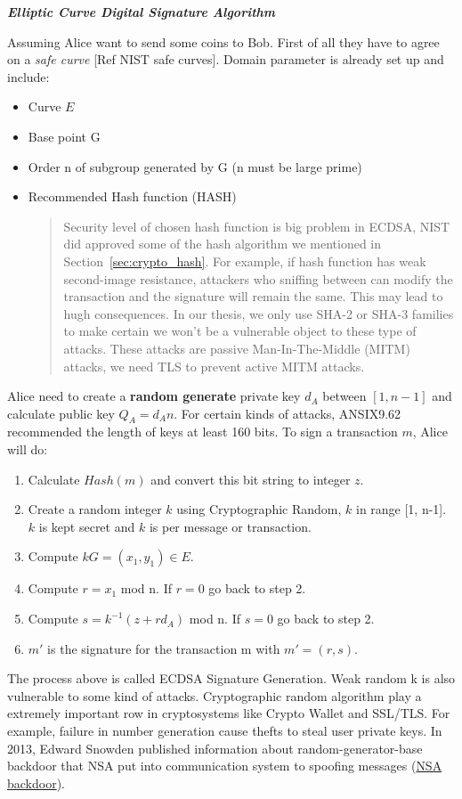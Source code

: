 \bigskip
{\textit {\textbf{Elliptic Curve Digital Signature Algorithm}}}

Assuming Alice want to send some coins to Bob. First of all they have to agree on a \emph{safe curve} [Ref NIST safe curves].
Domain parameter is already set up and include:
\begin{itemize}
  \item Curve $E$
  \item Base point G
  \item Order n of subgroup generated by G (n must be large prime)
  \item Recommended Hash function (HASH) \cite{SHS2015}
        \begin{quote}
          Security level of chosen hash function is big problem in ECDSA, NIST did approved some of the hash algorithm we mentioned in Section~\ref{sec:crypto_hash}.
          For example, if hash function has weak second-image resistance, attackers who sniffing between can modify the transaction and the signature will remain the same.
          This may lead to hugh consequences.
          In our thesis, we only use SHA-2 or SHA-3 families to make certain we won't be a vulnerable object to these type of attacks. These attacks are passive Man-In-The-Middle (MITM) attacks, we need TLS to prevent active MITM attacks.
        \end{quote}
\end{itemize}

Alice need to create a {\bf random generate} private key $d_A$ between $[1, n-1]$ and calculate public key $Q_A = d_An$.
For certain kinds of attacks, ANSIX9.62 recommended the length of keys at least 160 bits.
To sign a transaction $m$, Alice will do:
\begin{enumerate}
  \item Calculate $Hash(m)$ and convert this bit string to integer $z$.
  \item Create a random integer $k$ using Cryptographic Random, $k$ in range [1, n-1]. $k$ is kept secret and $k$ is per message or transaction.
  \item Compute $kG = (x_1, y_1) \in E$.
  \item Compute $r=x_1$ mod n. If $r = 0$ go back to step 2.
  \item Compute $s=k^{-1}(z + rd_A)$ mod n. If $s = 0$ go back to step 2.
  \item $m'$ is the signature for the transaction m with $m' = (r, s)$.
\end{enumerate}
The process above is called ECDSA Signature Generation.
Weak random k is also vulnerable to some kind of attacks.
Cryptographic random algorithm play a extremely important row in cryptosystems like Crypto Wallet and SSL/TLS.
For example, failure in number generation cause thefts to steal user private keys.
In 2013, Edward Snowden published information about random-generator-base backdoor that NSA put into communication system to spoofing messages (\href{https://www.bbc.com/news/technology-24048343}{NSA backdoor}).

